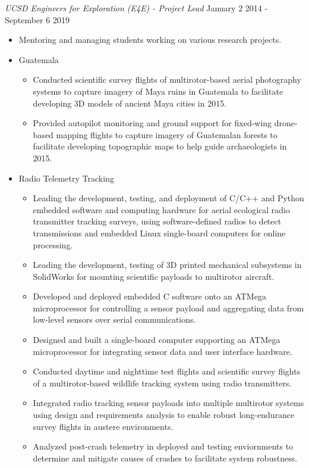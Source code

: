 \documentclass[line,margin]{res}
\begin{document}
\begin{resume}
	{\sl UCSD Engineers for Exploration (E4E) - Project Lead} \hfill January 2 2014 - September 6 2019
	\begin{itemize}
		\item Mentoring and managing students working on various research projects.
		\item Guatemala
		\begin{itemize}
			\item Conducted scientific survey flights of multirotor-based aerial photography systems to capture imagery of Maya ruins in Guatemala to facilitate developing 3D models of ancient Maya cities in 2015.
			\item Provided autopilot monitoring and ground support for fixed-wing drone-based mapping flights to capture imagery of Guatemalan forests to facilitate developing topographic maps to help guide archaeologists in 2015.
		\end{itemize}
		\item Radio Telemetry Tracking
		\begin{itemize}
			\item Leading the development, testing, and deployment of C/C++ and Python embedded software and computing hardware for aerial ecological radio transmitter tracking surveys, using software-defined radios to detect transmissions and embedded Linux single-board computers for online processing.
			\item Leading the development, testing of 3D printed mechanical subsystems in SolidWorks for mounting scientific payloads to multirotor aircraft.
			\item Developed and deployed embedded C software onto an ATMega microprocessor for controlling a sensor payload and aggregating data from low-level sensors over serial communications.
			\item Designed and built a single-board computer supporting an ATMega microprocessor for integrating sensor data and user interface hardware.
			\item Conducted daytime and nighttime test flights and scientific survey flights of a multirotor-based wildlife tracking system using radio transmitters.
			\item Integrated radio tracking sensor payloads into multiple multirotor systems using design and requirements analysis to enable robust long-endurance survey flights in austere environments.
			\item Analyzed post-crash telemetry in deployed and testing enviornments to determine and mitigate causes of crashes to facilitate system robustness.

\end{itemize}
\end{itemize}
\end{resume}
\end{document}
